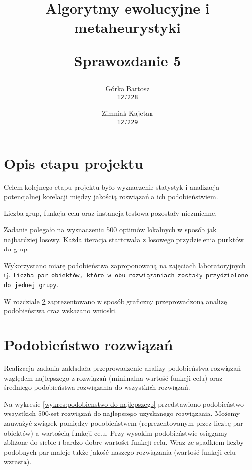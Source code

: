 \documentclass[main.tex]{subfiles}
\begin{document}
\title{
    \textbf{Algorytmy ewolucyjne i metaheurystyki}\\
    \begin{large}
        Sprawozdanie 5
    \end{large}
}

\author{
    Górka Bartosz\\
  \texttt{127228}
  \and
  Zimniak Kajetan\\
  \texttt{127229}
}

\date{}

\maketitle

\section{Opis etapu projektu}
Celem kolejnego etapu projektu było wyznaczenie statystyk i analizacja potencjalnej korelacji między jakością rozwiązań a ich podobieństwiem.

Liczba grup, funkcja celu oraz instancja testowa pozostały niezmienne.

Zadanie polegało na wyznaczeniu 500 optimów lokalnych w sposób jak najbardziej losowy. Każda iteracja startowała z losowego przydzielenia punktów do grup.

Wykorzystano miarę podobieństwa zaproponowaną na zajęciach laboratoryjnych tj. \texttt{liczba par obiektów, które w obu rozwiązaniach zostały przydzielone do jednej grupy}.

W rozdziale \ref{section:podobienstwo} zaprezentowano w sposób graficzny przeprowadzoną analizę podobieństwa oraz wskazano wnioski.

\section{Podobieństwo rozwiązań}
\label{section:podobienstwo}
Realizacja zadania zakładała przeprowadzenie analizy podobieństwa rozwiązań względem najlepszego z rozwiązań (minimalna wartość funkcji celu) oraz średniego podobieństwa rozwiązania do wszystkich rozwiązań.

Na wykresie \ref{wykres:podobienstwo-do-najlepszego} przedstawiono podobieństwo wszystkich 500-set rozwiązań do najlepszego uzyskanego rozwiązania. Możemy zauważyć związek pomiędzy podobieństwem (reprezentowanym przez liczbę par obiektów) a wartością funkcji celu. Przy wysokim podobieństwie osiągamy zbliżone do siebie i bardzo dobre wartości funkcji celu. Wraz ze spadkiem liczby podobnych par maleje także jakość naszego rozwiązania (wartość funkcji celu wzrasta).
\end{document}
